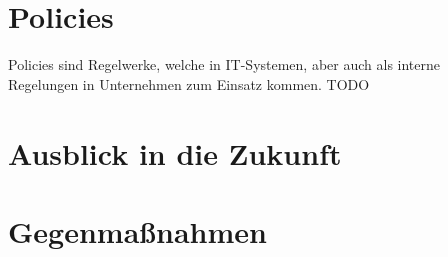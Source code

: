 \documentclass[a4paper,11pt,DIV=11,BROC=5mm,bigheadings,idxtotoc,cleardoubleempty,halfparskip,oneside,openright]{scrreprt} %
\begin{document}
			
						
				\cleardoublepage

			
				\cleardoublepage	
					
			\tableofcontents
				\cleardoublepage	
		
			\printnomenclature
				\cleardoublepage	
			
			\setcounter{page}{1}            
            \cleardoublepage
            
            
                \cleardoublepage
                
			

			
			
			
			\chapter{Policies} \label{Policies}
Policies sind Regelwerke, welche in IT-Systemen, aber auch als interne Regelungen in Unternehmen zum Einsatz kommen. TODO


			

			\chapter{Ausblick in die Zukunft}			
			
			\chapter{Gegenmaßnahmen}
	
			
			
			
			
			\newpage
		
	
\end{document}
